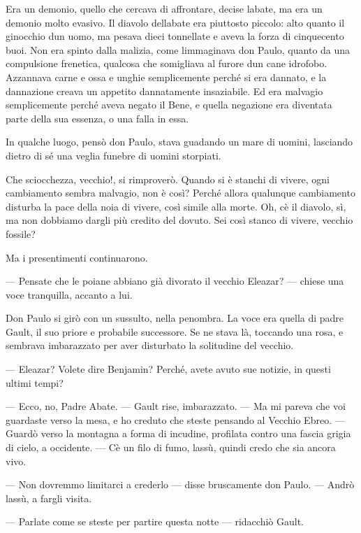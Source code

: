 Era un demonio, quello che cercava di affrontare, decise
l\textquotesingle abate, ma era un demonio molto evasivo. Il diavolo
dell\textquotesingle abate era piuttosto piccolo: alto quanto il
ginocchio d\textquotesingle un uomo, ma pesava dieci tonnellate e aveva
la forza di cinquecento buoi. Non era spinto dalla malizia, come
l\textquotesingle immaginava don Paulo, quanto da una compulsione
frenetica, qualcosa che somigliava al furore d\textquotesingle un cane
idrofobo. Azzannava carne e ossa e unghie semplicemente perché si era
dannato, e la dannazione creava un appetito dannatamente insaziabile. Ed
era malvagio semplicemente perché aveva negato il Bene, e quella
negazione era diventata parte della sua essenza, o una falla in essa.

In qualche luogo, pensò don Paulo, stava guadando un mare di uomini,
lasciando dietro di sé una veglia funebre di uomini storpiati.

Che sciocchezza, vecchio!, si rimproverò. Quando si è stanchi di vivere,
ogni cambiamento sembra malvagio, non è così? Perché allora qualunque
cambiamento disturba la pace della noia di vivere, così simile alla
morte. Oh, c\textquotesingle è il diavolo, sì, ma non dobbiamo dargli
più credito del dovuto. Sei così stanco di vivere, vecchio fossile?

Ma i presentimenti continuarono.

--- Pensate che le poiane abbiano già divorato il vecchio Eleazar? ---
chiese una voce tranquilla, accanto a lui.

Don Paulo si girò con un sussulto, nella penombra. La voce era quella di
padre Gault, il suo priore e probabile successore. Se ne stava là,
toccando una rosa, e sembrava imbarazzato per aver disturbato la
solitudine del vecchio.

--- Eleazar? Volete dire Benjamin? Perché, avete avuto sue notizie, in
questi ultimi tempi?

--- Ecco, no, Padre Abate. --- Gault rise, imbarazzato. --- Ma mi pareva
che voi guardaste verso la mesa, e ho creduto che steste pensando al
Vecchio Ebreo. --- Guardò verso la montagna a forma di incudine,
profilata contro una fascia grigia di cielo, a occidente. ---
C\textquotesingle è un filo di fumo, lassù, quindi credo che sia ancora
vivo.

--- Non dovremmo limitarci a crederlo --- disse bruscamente don Paulo.
--- Andrò lassù, a fargli visita.

--- Parlate come se steste per partire questa notte --- ridacchiò Gault.

